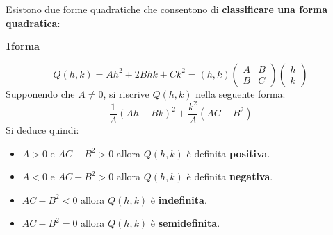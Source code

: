 \documentclass[a4paper]{article}
\newcommand{\definition}[1]{\textcolor{Red3}{\textbf{#1}}}
\newcommand{\example}[1]{\textcolor{Green4}{\textbf{#1}}}
\begin{document}
	Esistono due forme quadratiche che consentono di \textbf{classificare una forma quadratica}:
	
	\begin{flushleft}
		\example{\textbf{\underline{1\degree forma}}}
	\end{flushleft}
	\begin{equation}\label{eq: 1a forma quadratica}
		Q\left(h,k\right) = Ah^{2} + 2B hk + Ck^{2} = \left(h,k\right)\begin{pmatrix}
			A & B \\ B & C
		\end{pmatrix}
		\begin{pmatrix}
			h \\ k
		\end{pmatrix}
	\end{equation}
	Supponendo che $A\ne 0$, si riscrive $Q\left(h,k\right)$ nella seguente forma:
	\begin{equation*}
		\dfrac{1}{A}\left(Ah + Bk\right)^{2} + \dfrac{k^{2}}{A}\left(AC - B^{2}\right)
	\end{equation*}
	Si deduce quindi:
	\begin{boxdef}
		\begin{itemize}
			\item $A > 0$ e $AC - B^{2} > 0$ allora $Q\left(h,k\right)$ è definita \definition{positiva}.
	
			\item $A < 0$ e $AC - B^{2} > 0$ allora $Q\left(h,k\right)$ è definita \definition{negativa}.
			
			\item $AC - B^{2} < 0$ allora $Q\left(h,k\right)$ è \definition{indefinita}.
	
			\item $AC - B^{2} = 0$ allora $Q\left(h,k\right)$ è \definition{semidefinita}.
		\end{itemize}
	\end{boxdef}
\end{document}
